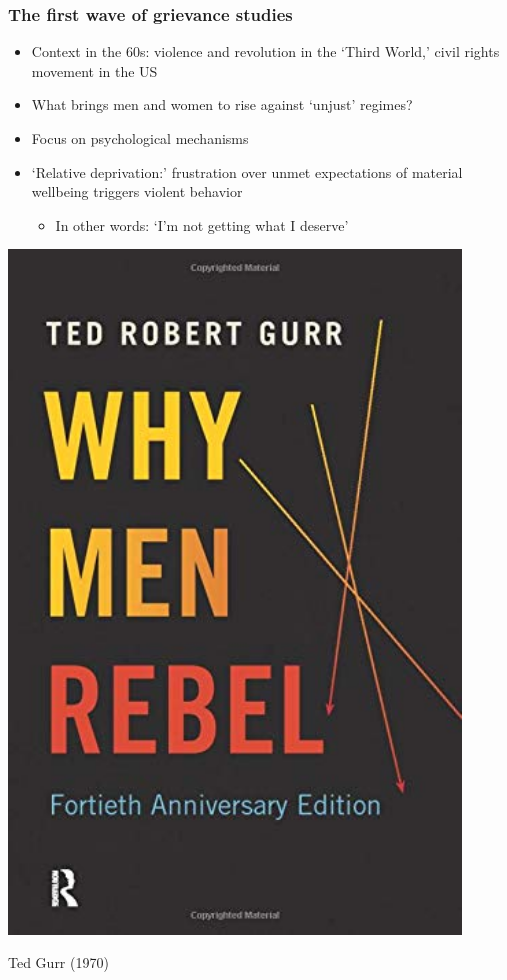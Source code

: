 \documentclass[aspectratio=43]{beamer}
\begin{document}
\begin{frame}
\frametitle{The first wave of grievance studies}
\centering

\begin{minipage}{0.59\textwidth}\centering
\begin{itemize}
  \item Context in the 60s: violence and revolution in the `Third World,' civil rights movement in the US
  \item What brings men and women to rise against `unjust' regimes?
  \item Focus on psychological mechanisms
  \item `Relative deprivation:' frustration over unmet expectations of material wellbeing triggers violent behavior
  \begin{itemize}
    \item In other words: `I'm not getting what I deserve'
  \end{itemize}
\end{itemize}
\end{minipage}\hfill
\begin{minipage}{0.4\textwidth}\centering
\includegraphics[width = 0.9\textwidth]{img/why_men_rebel}

Ted Gurr (1970)
\end{minipage}

\end{frame}
\end{document}
